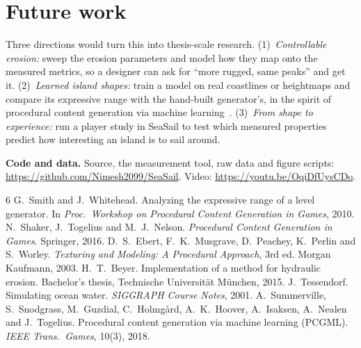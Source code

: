 \documentclass[10pt,twocolumn]{article}
\begin{document}
\section{Future work}
Three directions would turn this into thesis-scale research. (1)~\emph{Controllable erosion:} sweep the erosion parameters and model how they map onto the measured metrics, so a designer can ask for ``more rugged, same peaks'' and get it. (2)~\emph{Learned island shapes:} train a model on real coastlines or heightmaps and compare its expressive range with the hand-built generator's, in the spirit of procedural content generation via machine learning~\cite{pcgml}. (3)~\emph{From shape to experience:} run a player study in SeaSail to test which measured properties predict how interesting an island is to sail around.

\textbf{Code and data.} Source, the measurement tool, raw data and figure scripts: \url{https://github.com/Nimesh2099/SeaSail}. Video: \url{https://youtu.be/OqiDfUysCDo}.

\small
\begin{thebibliography}{6}\setlength{\itemsep}{1pt}
 G.~Smith and J.~Whitehead. Analyzing the expressive range of a level generator. In \emph{Proc.\ Workshop on Procedural Content Generation in Games}, 2010.
 N.~Shaker, J.~Togelius and M.~J.~Nelson. \emph{Procedural Content Generation in Games}. Springer, 2016.
 D.~S.~Ebert, F.~K.~Musgrave, D.~Peachey, K.~Perlin and S.~Worley. \emph{Texturing and Modeling: A Procedural Approach}, 3rd ed. Morgan Kaufmann, 2003.
 H.~T.~Beyer. Implementation of a method for hydraulic erosion. Bachelor's thesis, Technische Universit\"at M\"unchen, 2015.
 J.~Tessendorf. Simulating ocean water. \emph{SIGGRAPH Course Notes}, 2001.
 A.~Summerville, S.~Snodgrass, M.~Guzdial, C.~Holmg\aa rd, A.~K.~Hoover, A.~Isaksen, A.~Nealen and J.~Togelius. Procedural content generation via machine learning (PCGML). \emph{IEEE Trans.\ Games}, 10(3), 2018.
\end{thebibliography}
\end{document}
